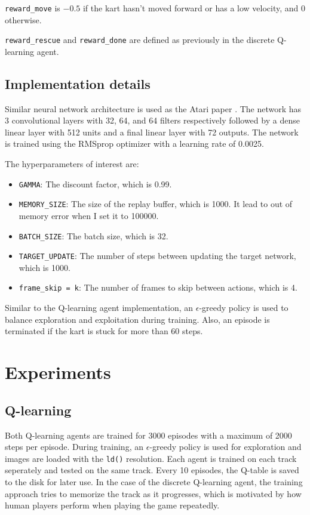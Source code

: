 \documentclass{article}
\begin{document}
\texttt{reward\_move} is $-0.5$ if the kart hasn't moved forward or has a low velocity, and $0$ otherwise.
    
\texttt{reward\_rescue} and \texttt{reward\_done} are defined as previously in the discrete Q-learning agent.

\subsection{Implementation details}

Similar neural network architecture is used as the Atari paper \citep{mnih}. The network has 3 convolutional layers with 32, 64, and 64 filters respectively followed by a dense linear layer with 512 units and a final linear layer with 72 outputs. The network is trained using the RMSprop optimizer with a learning rate of 0.0025.

The hyperparameters of interest are:
\begin{itemize}
    \item \texttt{GAMMA}: The discount factor, which is 0.99.
    \item \texttt{MEMORY\_SIZE}: The size of the replay buffer, which is 1000. It lead to out of memory error when I set it to 100000.
    \item \texttt{BATCH\_SIZE}: The batch size, which is 32.
    \item \texttt{TARGET\_UPDATE}: The number of steps between updating the target network, which is 1000.
    \item \texttt{frame\_skip = k}: The number of frames to skip between actions, which is 4.
\end{itemize}

Similar to the Q-learning agent implementation, an $\epsilon$-greedy policy is used to balance exploration and exploitation during training. Also, an episode is terminated if the kart is stuck for more than 60 steps.

\section{Experiments}

\subsection{Q-learning}

Both Q-learning agents are trained for 3000 episodes with a maximum of 2000 steps per episode. During training, an $\epsilon$-greedy policy is used for exploration and images are loaded with the \texttt{ld()} resolution. Each agent is trained on each track seperately and tested on the same track. Every 10 episodes, the Q-table is saved to the disk for later use. In the case of the discrete Q-learning agent, the training approach tries to memorize the track as it progresses, which is motivated by how human players perform when playing the game repeatedly.
\end{document}
